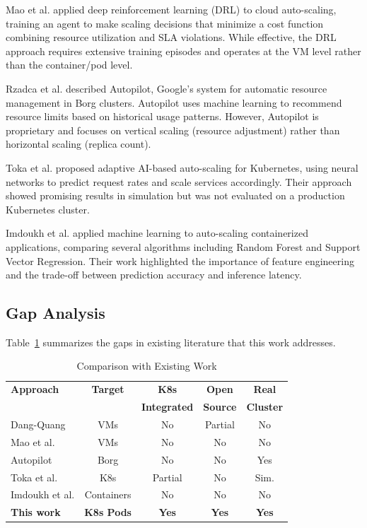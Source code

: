 \documentclass[journal]{IEEEtran}
\begin{document}
Mao et al. \cite{mao2016} applied deep reinforcement learning (DRL) to cloud auto-scaling, training an agent to make scaling decisions that minimize a cost function combining resource utilization and SLA violations. While effective, the DRL approach requires extensive training episodes and operates at the VM level rather than the container/pod level.

Rzadca et al. \cite{rzadca2020} described Autopilot, Google's system for automatic resource management in Borg clusters. Autopilot uses machine learning to recommend resource limits based on historical usage patterns. However, Autopilot is proprietary and focuses on vertical scaling (resource adjustment) rather than horizontal scaling (replica count).

Toka et al. \cite{toka2021} proposed adaptive AI-based auto-scaling for Kubernetes, using neural networks to predict request rates and scale services accordingly. Their approach showed promising results in simulation but was not evaluated on a production Kubernetes cluster.

Imdoukh et al. \cite{imdoukh2020} applied machine learning to auto-scaling containerized applications, comparing several algorithms including Random Forest and Support Vector Regression. Their work highlighted the importance of feature engineering and the trade-off between prediction accuracy and inference latency.

\subsection{Gap Analysis}
Table~\ref{tab:gap} summarizes the gaps in existing literature that this work addresses.

\begin{table}[h]
\centering
\caption{Comparison with Existing Work}
\label{tab:gap}
\begin{tabular}{@{}lcccc@{}}
\toprule
\textbf{Approach} & \textbf{Target} & \textbf{K8s} & \textbf{Open} & \textbf{Real} \\
 & & \textbf{Integrated} & \textbf{Source} & \textbf{Cluster} \\
\midrule
Dang-Quang \cite{dangquang2021} & VMs & No & Partial & No \\
Mao et al. \cite{mao2016} & VMs & No & No & No \\
Autopilot \cite{rzadca2020} & Borg & No & No & Yes \\
Toka et al. \cite{toka2021} & K8s & Partial & No & Sim. \\
Imdoukh et al. \cite{imdoukh2020} & Containers & No & No & No \\
\textbf{This work} & \textbf{K8s Pods} & \textbf{Yes} & \textbf{Yes} & \textbf{Yes} \\
\bottomrule
\end{tabular}
\end{table}
\end{document}
